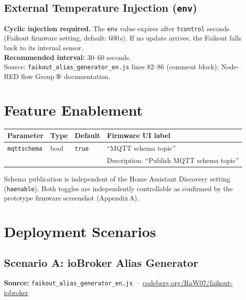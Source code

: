 \documentclass[11pt,a4paper]{article}
\newcommand{\field}[1]{\texttt{\color{codegreen}#1}}
\newcommand{\param}[1]{\texttt{\color{primary}#1}}
\begin{document}
\subsection{External Temperature Injection (\texttt{env})}

\begin{warnbox}
\textbf{Cyclic injection required.} The \field{env} value expires after \param{tcontrol} seconds (Faikout firmware setting, default: 600\,s). If no update arrives, the Faikout falls back to its internal sensor.\\[4pt]
\textbf{Recommended interval:} 30–60 seconds.\\[4pt]
Source: \texttt{faikout\_alias\_generator\_en.js} lines 82–86 (comment block); Node-RED flow Group\,⑤ documentation.
\end{warnbox}

\section{Feature Enablement}

\begin{tabular}{@{}llll@{}}
\toprule
\textbf{Parameter} & \textbf{Type} & \textbf{Default} & \textbf{Firmware UI label} \\
\midrule
\rowcolor{lightbg}
\param{mqttschema} & bool & \texttt{true} & ``MQTT schema topic'' \\
& & & Description: ``Publish MQTT schema topic'' \\
\bottomrule
\end{tabular}

\vspace{6pt}
Schema publication is independent of the Home Assistant Discovery setting (\param{haenable}). Both toggles are independently controllable as confirmed by the prototype firmware screenshot (Appendix\,A).

\section{Deployment Scenarios}

\subsection{Scenario A: ioBroker Alias Generator}

\textbf{Source:} \texttt{faikout\_alias\_generator\_en.js} · \href{https://codeberg.org/RaW07/faikout-iobroker}{codeberg.org/RaW07/faikout-iobroker}
\end{document}
